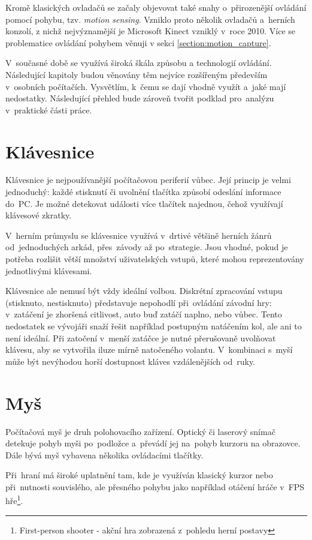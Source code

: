 \documentclass[thesis=B,czech,hidelinks]{FITthesis}[2012/06/26] %
\begin{document}
Kromě klasických ovladačů se začaly objevovat také snahy o~přirozenější ovládání pomocí pohybu, tzv. \textit{motion sensing}. Vzniklo proto několik ovladačů a~herních konzolí, z nichž nejvýznamější je Microsoft Kinect vzniklý v~roce 2010.\cite{wikicontrollers} Více se problematice ovládání pohybem věnuji v sekci \ref{section:motion_capture}.

V~současné době se využívá široká škála způsobu a technologií ovládání. Následující kapitoly budou věnovány těm nejvíce rozšířeným především v~osobních počítačích. Vysvětlím, k~čemu se dají vhodně využít a~jaké mají nedostatky. Následující přehled bude zároveň tvořit podklad pro~analýzu v~praktické části práce.

\section{Klávesnice}

Klávesnice je nejpoužívanější počítačovou periferií vůbec. Její princip je velmi jednoduchý: každé stisknutí či uvolnění tlačítka způsobí odeslání informace do~PC. Je možné detekovat události více tlačítek najednou, čehož využívají klávesové zkratky.

V~herním průmyslu se klávesnice využívá v~drtivé většině herních žánrů od~jednoduchých arkád, přes~závody až po~strategie. Jsou vhodné, pokud je potřeba rozlišit větší množství uživatelských vstupů, které mohou reprezentovány jednotlivými klávesami.

Klávesnice ale nemusí být vždy ideální volbou. Diskrétní zpracování vstupu (stisknuto, nestisknuto) představuje nepohodlí při~ovládání závodní hry: v~zatáčení je zhoršená citlivost, auto buď zatáčí naplno, nebo vůbec. Tento nedostatek se vývojáři snaží řešit například postupným natáčením kol, ale ani to není ideální. Při zatočení v~menší zatáčce je nutné přerušovaně uvolňovat klávesu, aby se vytvořila iluze mírně natočeného volantu. V~kombinaci s~myší může být nevýhodou horší dostupnost kláves vzdálenějších od~ruky.

\section{Myš}

Počítačová myš je druh polohovacího zařízení. Optický či laserový snímač detekuje pohyb myši po~podložce a~převádí jej na~pohyb kurzoru na obrazovce. Dále bývá myš vybavena několika ovládacími tlačítky.

Při~hraní má široké uplatnění tam, kde je využíván klasický kurzor nebo při~nutnosti souvislého, ale přesného pohybu jako například otáčení hráče v~FPS hře\footnote{First-person shooter - akční hra zobrazená z~pohledu herní postavy}.
\end{document}
